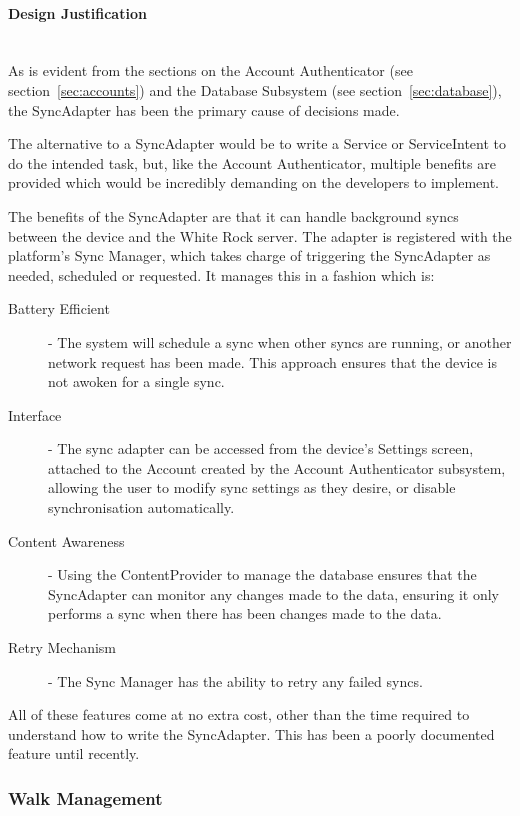 \documentclass[11pt,a4paper]{report}
\begin{document}
\paragraph*{Design Justification}\mbox{}\\ 
As is evident from the sections on the Account Authenticator (see section~\ref{sec:accounts}) and the Database Subsystem (see section~\ref{sec:database}), the SyncAdapter has been the primary cause of decisions made. 

The alternative to a SyncAdapter would be to write a Service or ServiceIntent to do the intended task, but, like the Account Authenticator, multiple benefits are provided which would be incredibly demanding on the developers to implement.

The benefits of the SyncAdapter are that it can handle background syncs between the device and the White Rock server. The adapter is registered with the platform's Sync Manager, which takes charge of triggering the SyncAdapter as needed, scheduled or requested. It manages this in a fashion which is:
\begin{description}
\item[Battery Efficient] - The system will schedule a sync when other syncs are running, or another network request has been made. This approach ensures that the device is not awoken for a single sync.
\item[Interface] - The sync adapter can be accessed from the device's Settings screen, attached to the Account created by the Account Authenticator subsystem, allowing the user to modify sync settings as they desire, or disable synchronisation automatically.
\item[Content Awareness] - Using the ContentProvider to manage the database ensures that the SyncAdapter can monitor any changes made to the data, ensuring it only performs a sync when there has been changes made to the data.
\item[Retry Mechanism] - The Sync Manager has the ability to retry any failed syncs.
\end{description}
All of these features come at no extra cost, other than the time required to understand how to write the SyncAdapter. This has been a poorly documented feature until recently.

\subsubsection{Walk Management}
\label{sec:walkcreate}
\end{document}
